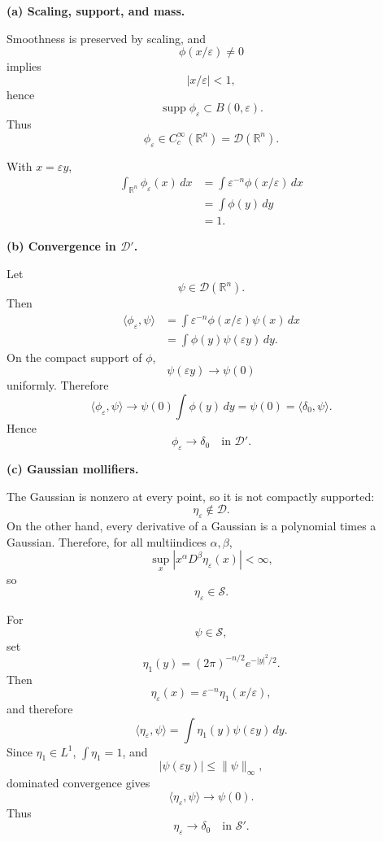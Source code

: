 \begin{solution}
\par\smallskip\noindent\textbf{(a) Scaling, support, and mass.}

Smoothness is preserved by scaling, and
\[
\phi(x/\varepsilon)\ne0
\]
implies
\[
|x/\varepsilon|<1,
\]
hence
\[
\operatorname{supp}\phi_\varepsilon
\subset
B(0,\varepsilon).
\]
Thus
\[
\phi_\varepsilon\in C_c^\infty(\mathbb R^n)=\mathcal D(\mathbb R^n).
\]

With \(x=\varepsilon y\),
\[
\begin{aligned}
\int_{\mathbb R^n}
\phi_\varepsilon(x)\,dx
&=
\int
\varepsilon^{-n}
\phi(x/\varepsilon)\,dx\\
&=
\int
\phi(y)\,dy\\
&=1.
\end{aligned}
\]

\par\smallskip\noindent\textbf{(b) Convergence in \(\mathcal D'\).}

Let
\[
\psi\in\mathcal D(\mathbb R^n).
\]
Then
\[
\begin{aligned}
\langle\phi_\varepsilon,\psi\rangle
&=
\int
\varepsilon^{-n}
\phi(x/\varepsilon)\psi(x)\,dx\\
&=
\int
\phi(y)\psi(\varepsilon y)\,dy.
\end{aligned}
\]
On the compact support of \(\phi\),
\[
\psi(\varepsilon y)\to\psi(0)
\]
uniformly. Therefore
\[
\langle\phi_\varepsilon,\psi\rangle
\longrightarrow
\psi(0)
\int\phi(y)\,dy
=
\psi(0)
=
\langle\delta_0,\psi\rangle.
\]
Hence
\[
\boxed{
\phi_\varepsilon\to\delta_0
\quad\text{in }\mathcal D'.}
\]

\par\smallskip\noindent\textbf{(c) Gaussian mollifiers.}

The Gaussian is nonzero at every point, so it is not compactly supported:
\[
\boxed{\eta_\varepsilon\notin\mathcal D.}
\]
On the other hand, every derivative of a Gaussian is a polynomial times a
Gaussian. Therefore, for all multiindices \(\alpha,\beta\),
\[
\sup_x
|x^\alpha D^\beta\eta_\varepsilon(x)|
<\infty,
\]
so
\[
\boxed{\eta_\varepsilon\in\mathcal S.}
\]

For
\[
\psi\in\mathcal S,
\]
set
\[
\eta_1(y)
=
(2\pi)^{-n/2}e^{-|y|^2/2}.
\]
Then
\[
\eta_\varepsilon(x)
=
\varepsilon^{-n}\eta_1(x/\varepsilon),
\]
and therefore
\[
\langle\eta_\varepsilon,\psi\rangle
=
\int
\eta_1(y)\psi(\varepsilon y)\,dy.
\]
Since \(\eta_1\in L^1\), \(\int\eta_1=1\), and
\[
|\psi(\varepsilon y)|
\le
\|\psi\|_\infty,
\]
dominated convergence gives
\[
\langle\eta_\varepsilon,\psi\rangle
\to
\psi(0).
\]
Thus
\[
\boxed{
\eta_\varepsilon\to\delta_0
\quad\text{in }\mathcal S'.}
\]


\end{solution}
